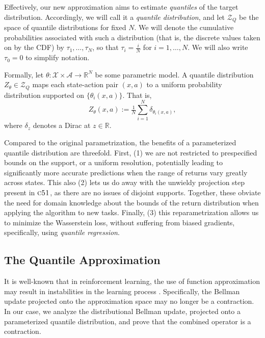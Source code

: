 \documentclass[letterpaper]{article}
\newcommand{\cX}{\mathcal{X}}
\newcommand{\cA}{\mathcal{A}}
\newcommand{\cZ}{\mathcal{Z}}
\newcommand{\bR}{\mathbb{R}}
\def \cfo {\textsc{c51}}
\def \qcZ {\cZ_{Q}}
\begin{document}
Effectively, our new approximation aims to estimate \emph{quantiles} of the target distribution. Accordingly, we will call it a \emph{quantile distribution}, and let $\qcZ$ be the space of quantile distributions for fixed $N$. We will denote the cumulative probabilities associated with such a distribution (that is, the discrete values taken on by the CDF) by $\tau_1 ,\ldots, \tau_N$, so that $\tau_i = \frac{i}{N}$ for $i=1,\ldots,N$. We will also write $\tau_0=0$ to simplify notation.

Formally, let $\theta : \cX \times \cA \to \bR^N$ be some parametric model. A quantile distribution $Z_\theta \in \qcZ$ maps each state-action pair $(x,a)$ to a uniform probability distribution supported on $\{ \theta_i(x,a) \}$. That is, 
\begin{equation}\label{eqn:definition_quantile_distribution}
    Z_\theta(x,a) := \tfrac{1}{N} \sum_{i=1}^N \delta_{\theta_i(x,a)},
\end{equation}
where $\delta_z$ denotes a Dirac at $z \in \mathbb{R}$.

Compared to the original parametrization, the benefits of a parameterized quantile distribution are threefold. First, (1) we are not restricted to prespecified bounds on the support, or a uniform resolution, potentially leading to significantly more accurate predictions when the range of returns vary greatly across states. This also (2) lets us do away with the unwieldy projection step present in $\cfo$, as there are no issues of disjoint supports. Together, these obviate the need for domain knowledge about the bounds of the return distribution when applying the algorithm to new tasks. Finally, (3) this reparametrization allows us to minimize the Wasserstein loss, without suffering from biased gradients, specifically, using \emph{quantile regression}.


\subsection{The Quantile Approximation}

It is well-known that in reinforcement learning, the use of function approximation may result in instabilities in the learning process \cite{tsitsiklis97analysis}. Specifically, the Bellman update projected onto the approximation space may no longer be a contraction. In our case, we analyze the distributional Bellman update, projected onto a parameterized quantile distribution, and prove that the combined operator is a contraction.
\end{document}

